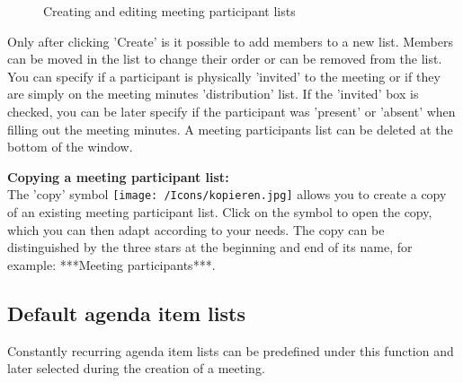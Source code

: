 \begin{figure}[H]
\end{figure}

\begin{figure}[H]
\vspace{-25pt}
\caption{Creating and editing meeting participant lists}
\end{figure}

Only after clicking 'Create' is it possible to add members to a new list. Members can be moved in the list to change their order or can be removed from the list. You can specify if a participant is physically 'invited' to the meeting or if they are simply on the meeting minutes 'distribution' list. If the 'invited' box is checked, you can be later specify if the participant was 'present' or 'absent' when filling out the meeting minutes. A meeting participants list can be deleted at the bottom of the window.

\vspace{\baselineskip}

\textbf{Copying a meeting participant list:}\\
The 'copy' symbol \texttt{[image: /Icons/kopieren.jpg]} allows you to create a copy of an existing meeting participant list. Click on the symbol to open the copy, which you can then adapt according to your needs. The copy can be distinguished by the three stars at the beginning and end of its name, for example: ***Meeting participants***.

\clearpage
\subsection{Default agenda item lists}

Constantly recurring agenda item lists can be predefined under this function and later selected during the creation of a meeting.

